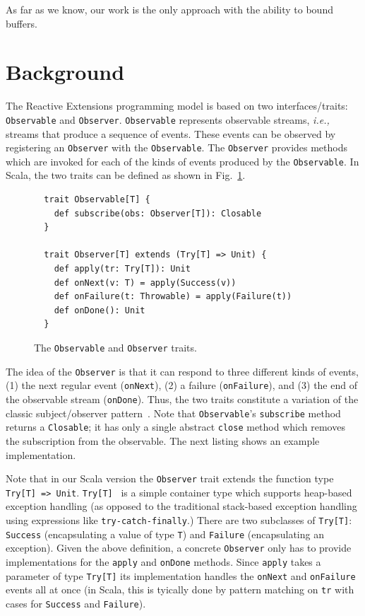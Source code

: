 \documentclass[runningheads]{llncs}
\newcommand{\ie}{{\em i.e.,~}}
\begin{document}
\begin{sloppypar}
As far as we know, our work is the only approach with the ability to bound buffers.


\section{Background}

The Reactive Extensions programming model is based on two interfaces/traits: \verb|Observable|
and \verb|Observer|. \verb|Observable| represents observable streams, \ie
streams that produce a sequence of events. These events can be observed by
registering an \verb|Observer| with the \verb|Observable|. The \verb|Observer|
provides methods which are invoked for each of the kinds of events produced by
the \verb|Observable|. In Scala, the two traits can be defined as shown in
Fig.~\ref{fig:observable-observer}.

\begin{figure}[ht!]
  \centering
  \lstset{numbers=none,xleftmargin=0em}
  \begin{lstlisting}
  trait Observable[T] {
    def subscribe(obs: Observer[T]): Closable
  }

  trait Observer[T] extends (Try[T] => Unit) {
    def apply(tr: Try[T]): Unit
    def onNext(v: T) = apply(Success(v))
    def onFailure(t: Throwable) = apply(Failure(t))
    def onDone(): Unit
  }
  \end{lstlisting}
  \caption{The \texttt{Observable} and \texttt{Observer} traits.}
  \label{fig:observable-observer}
\end{figure}

The idea of the \verb|Observer| is that it can respond to three different
kinds of events, (1) the next regular event (\verb|onNext|), (2) a failure
(\verb|onFailure|), and (3) the end of the observable stream (\verb|onDone|).
Thus, the two traits constitute a variation of the classic subject/observer
pattern~\cite{EugsterFGK03}. Note that \verb|Observable|'s \verb|subscribe|
method returns a \verb|Closable|; it has only a single abstract \verb|close|
method which removes the subscription from the observable. The next listing
shows an example implementation.

Note that in our Scala version the \verb|Observer| trait extends the function
type \verb|Try[T] => Unit|. \verb|Try[T]|~\cite{FuturesSIP} is a simple container type which
supports heap-based exception handling (as opposed to the traditional stack-based
exception handling using expressions like \verb|try-catch-finally|.)
There are two subclasses of \verb|Try[T]|: \verb|Success| (encapsulating a
value of type \verb|T|) and \verb|Failure| (encapsulating an exception). Given
the above definition, a concrete \verb|Observer| only has to provide
implementations for the \verb|apply| and \verb|onDone| methods. Since
\verb|apply| takes a parameter of type \verb|Try[T]| its implementation
handles the \verb|onNext| and \verb|onFailure| events all at once (in Scala,
this is tyically done by pattern matching on \verb|tr| with cases for
\verb|Success| and \verb|Failure|).


\end{sloppypar}
\end{document}
